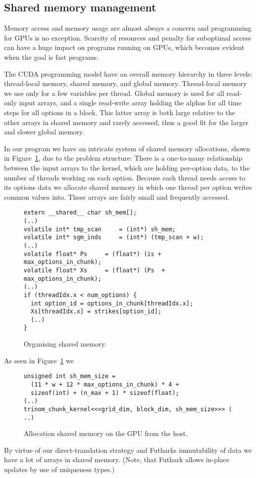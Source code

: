 \subsection{Shared memory management}

Memory access and memory usage are almost always a concern and
programming for GPUs is no exception. Scarcity of resources
and penalty for suboptimal access can have a huge impact on
programs running on GPUs, which becomes evident when the
goal is fast programs.

The CUDA programming model have an overall memory hierarchy
in three levels: thread-local memory, shared memory, and
global memory. Thread-local memory we use only for a few
variables per thread. Global memory is used for all
read-only input arrays, and a single read-write array
holding the alphas for all time steps for all options in a
block. This latter array is both large relative to the other
arrays in shared memory and rarely accessed, thus a good fit
for the larger and slower global memory.

In our program we have an intricate system of shared memory
allocations, shown in Figure~\ref{fig:shmem}, due to the
problem structure: There is a one-to-many relationship
between the input arrays to the kernel, which are holding
per-option data, to the number of threads working on each
option. Because each thread needs access to its options data
we allocate shared memory in which one thread per option
writes common values into. These arrays are fairly small and
frequently accessed.
%
\begin{figure}[bt]
\begin{center}
\begin{lstlisting}
extern __shared__ char sh_mem[];
(..)
volatile int* tmp_scan     = (int*) sh_mem;
volatile int* sgm_inds     = (int*) (tmp_scan + w);
(..)
volatile float* Ps     = (float*) (is + max_options_in_chunk);
volatile float* Xs     = (float*) (Ps  + max_options_in_chunk);
(..)
if (threadIdx.x < num_options) {
  int option_id = options_in_chunk[threadIdx.x];
  Xs[threadIdx.x] = strikes[option_id];
  (..)
}
\end{lstlisting}
\caption{Organising shared memory.}
\label{fig:shmem}
\end{center}
\end{figure}
%
As seen in Figure~\ref{fig:shmem} we 

%
\begin{figure}[bt]
\begin{center}
\begin{lstlisting}
unsigned int sh_mem_size =
  (11 * w + 12 * max_options_in_chunk) * 4 +
  sizeof(int) + (n_max + 1) * sizeof(float);
(..)
trinom_chunk_kernel<<<grid_dim, block_dim, sh_mem_size>>> ( ..)
\end{lstlisting}
\end{center}
\caption{Allocation shared memory on the GPU from the host.}
\label{fig:allocshmem}
\end{figure}
%
By virtue of our direct-translation strategy and Futharks
immutability of data we have a lot of arrays in shared
memory. (Note, that Futhark allows in-place updates by use
of uniqueness types.) 

